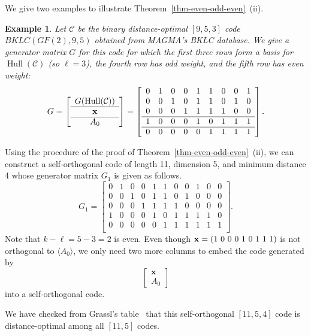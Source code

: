 \documentclass{article}
\theoremstyle{definition}
\newtheorem{example}{Example}[section]
\theoremstyle{remark}
\newcommand{\Hull}{\operatorname{Hull}}
\begin{document}
We give two examples to illustrate Theorem~\ref{thm-even-odd-even}~(ii).
\begin{example}{\em
Let $\mathcal C$ be the binary distance-optimal $[9, 5, 3]$ code $BKLC(GF(2), 9, 5)$ obtained from MAGMA's BKLC database. We give a generator matrix $G$ for this code for which the first three rows form a basis for $\Hull(\mathcal C)$ (so $\ell = 3$), the fourth row has odd weight, and the fifth row has even weight:
\[
G= \left[ \begin{array}{c}
G({\operatorname{Hull}}(\mathcal C)) \\
\hline
{\bf{x}} \\
\hline
A_0   \\
\end{array}
\right] = \left[
\begin{array}{ccccccccc}
0 &1 &0 &0 &1 &1 &0 &0 &1  \\
0 &0 &1 &0 &1 &1 &0 &1 &0  \\
0 &0 &0 &1 &1 &1 &1 &0 &0  \\
\hline
1 &0 &0 &0 &1 &0 &1 &1 &1  \\
\hline
0 &0 &0 &0 &0 &1 &1 &1 &1  \\
\end{array}
\right].
\]

Using the procedure of the proof of Theorem~\ref{thm-even-odd-even}~(ii), we can construct a self-orthogonal code of length 11, dimension 5, and minimum distance 4 whose generator matrix $G_1$ is given as follows.
\[
G_1 =\left[
\begin{array}{ccccccccc|cc}
0 &1 &0 &0 &1 &1 &0 &0 &1 &0 &0 \\
0 &0 &1 &0 &1 &1 &0 &1 &0 &0 &0 \\
0 &0 &0 &1 &1 &1 &1 &0 &0 &0 &0 \\
\hline
1 &0 &0 &0 &1 &0 &1 &1 &1 &1 &0 \\
\hline
0 &0 &0 &0 &0 &1 &1 &1 &1 &1 &1 \\
\end{array}
\right].
\]
Note that $k - \ell =5-3=2$ is even. Even though ${\bf{x}}=(1 ~ 0 ~ 0 ~ 0 ~ 1 ~ 0 ~ 1 ~ 1 ~ 1)$ is not orthogonal to $\langle A_0 \rangle$, we only need two more columns to embed the code generated by
\[
\begin{bmatrix}
    \mathbf{x}\\A_0
\end{bmatrix}
\]
into a self-orthogonal code.}
We have checked from Grassl's table~\cite{Grassl2026} that this self-orthogonal $[11, 5, 4]$ code is distance-optimal among all $[11, 5]$ codes.
\end{example}
\end{document}
